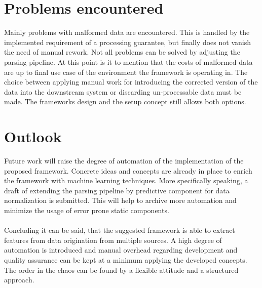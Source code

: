 \section{Problems encountered\label{sec:problems}}

Mainly problems with malformed data are encountered. This is handled by the implemented requirement of a processing guarantee, but finally does not vanish the need of manual rework. Not all problems can be solved by adjusting the parsing pipeline. At this point is it to mention that the costs of malformed data are up to final use case of the environment the framework is operating in. The choice between applying manual work for introducing the corrected version of the data into the downstream system or discarding un-processable data must be made. The frameworks design and the setup concept still allows both options. 

\section{Outlook\label{sec:outlook}}

Future work will raise the degree of automation of the implementation of the proposed framework. Concrete ideas and concepts are already in place to enrich the framework with machine learning techniques. More specifically speaking, a draft of extending the parsing pipeline by predictive component for data normalization is submitted. This will help to archive more automation and minimize the usage of error prone static components.
\\\\
Concluding it can be said, that the suggested framework is able to extract features from data origination from multiple sources. A high degree of automation is introduced and manual overhead regarding development and quality assurance can be kept at a minimum applying the developed concepts. The order in the chaos can be found by a flexible attitude and a structured approach. 